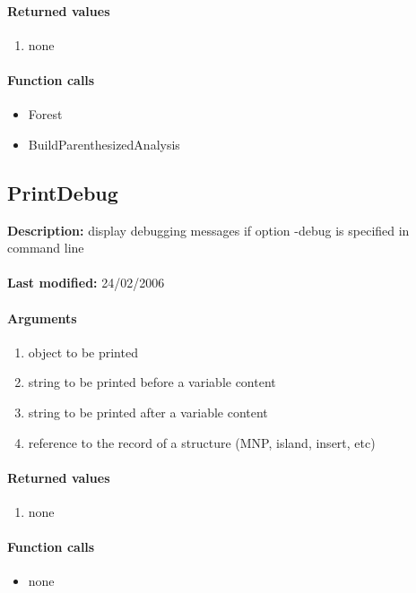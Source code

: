 \paragraph{Returned values}
\begin{enumerate}
\item none
\end{enumerate}

\paragraph{Function calls}
\begin{itemize}
\item Forest
\item BuildParenthesizedAnalysis
\end{itemize}

\subsection{PrintDebug}
\textbf{Description:} display debugging messages if option -debug is specified in command line\\
\\\textbf{Last modified:} 24/02/2006

\paragraph{Arguments}
\begin{enumerate}
\item object to be printed
\item string to be printed before a variable content
\item string to be printed after a variable content
\item reference to the record of a structure (MNP, island, insert, etc)
\end{enumerate}

\paragraph{Returned values}
\begin{enumerate}
\item none
\end{enumerate}

\paragraph{Function calls}
\begin{itemize}
\item none
\end{itemize}

